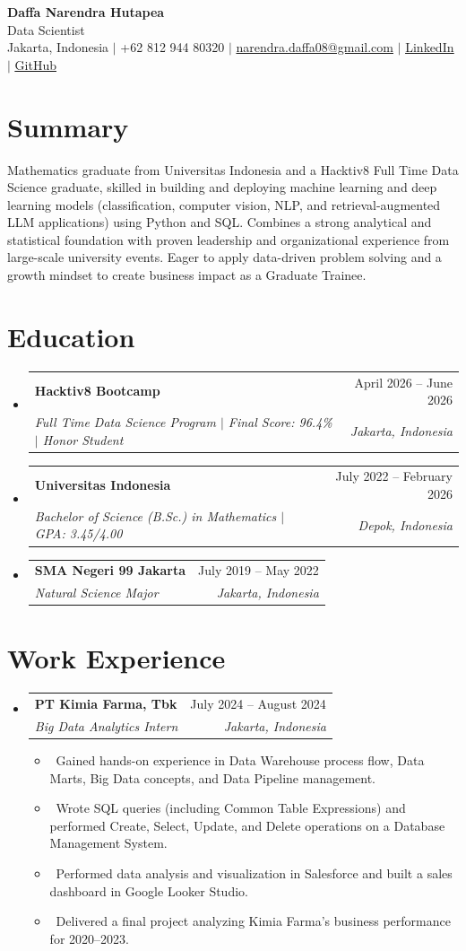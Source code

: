 \documentclass[letterpaper,10pt]{article}
\makeatletter
\newcommand{\resumeItem}[1]{\item\small{#1}}
\newcommand{\resumeSubheading}[4]{
\vspace{-1pt}\item
  \begin{tabular*}{0.97\textwidth}[t]{l@{\extracolsep{\fill}}r}
    \textbf{#1} & #2 \\
    \textit{#3} & \textit{#4} \\
  \end{tabular*}\vspace{-7pt}
}
\newcommand{\resumeSubHeadingList}{\begin{itemize}[leftmargin=0.15in, label={}]}
\newcommand{\resumeSubHeadingListEnd}{\end{itemize}}
\makeatother
\begin{document}
\begin{center}
  \textbf{\Huge Daffa Narendra Hutapea} \\ \vspace{3pt}
  {\large Data Scientist} \\ \vspace{3pt}
  \small Jakarta, Indonesia $|$ +62 812 944 80320 $|$
  \href{mailto:narendra.daffa08@gmail.com}{narendra.daffa08@gmail.com} $|$
  \href{https://linkedin.com/in/daffa-hutapea}{\underline{LinkedIn}} $|$
  \href{https://github.com/daphutapea}{\underline{GitHub}}
\end{center}

\section*{Summary}
Mathematics graduate from Universitas Indonesia and a Hacktiv8 Full Time Data Science graduate, skilled in building and deploying machine learning and deep learning models (classification, computer vision, NLP, and retrieval-augmented LLM applications) using Python and SQL. Combines a strong analytical and statistical foundation with proven leadership and organizational experience from large-scale university events. Eager to apply data-driven problem solving and a growth mindset to create business impact as a Graduate Trainee.

\section{Education}
\resumeSubHeadingList
  \resumeSubheading
      {Hacktiv8 Bootcamp}{April 2026 -- June 2026}
      {Full Time Data Science Program $|$ Final Score: 96.4\% $|$ Honor Student}{Jakarta, Indonesia}
  \resumeSubheading
      {Universitas Indonesia}{July 2022 -- February 2026}
      {Bachelor of Science (B.Sc.) in Mathematics $|$ GPA: 3.45/4.00}{Depok, Indonesia}
  \resumeSubheading
      {SMA Negeri 99 Jakarta}{July 2019 -- May 2022}
      {Natural Science Major}{Jakarta, Indonesia}
\resumeSubHeadingListEnd

\section{Work Experience}
\resumeSubHeadingList
  \resumeSubheading
      {PT Kimia Farma, Tbk}{July 2024 -- August 2024}
      {Big Data Analytics Intern}{Jakarta, Indonesia}
      \resumeSubHeadingList
          \resumeItem{\textbullet\ Gained hands-on experience in Data Warehouse process flow, Data Marts, Big Data concepts, and Data Pipeline management.}
          \resumeItem{\textbullet\ Wrote SQL queries (including Common Table Expressions) and performed Create, Select, Update, and Delete operations on a Database Management System.}
          \resumeItem{\textbullet\ Performed data analysis and visualization in Salesforce and built a sales dashboard in Google Looker Studio.}
          \resumeItem{\textbullet\ Delivered a final project analyzing Kimia Farma's business performance for 2020--2023.}
      \resumeSubHeadingListEnd
\resumeSubHeadingListEnd
\end{document}
